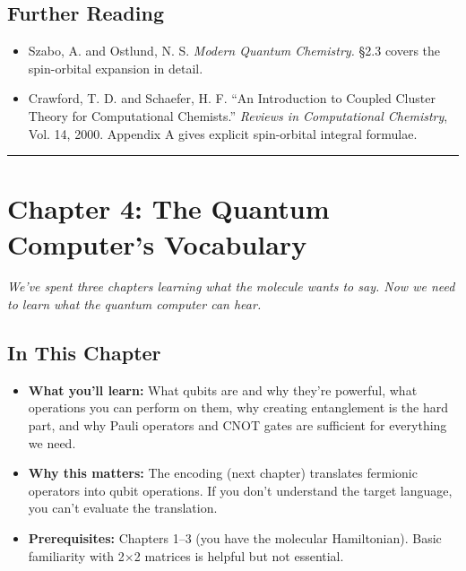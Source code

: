 \documentclass[
  11pt,
  oneside]{book}
\providecommand{\tightlist}{%
  \setlength{\itemsep}{0pt}\setlength{\parskip}{0pt}}
\begin{document}
\section{Further Reading}\label{further-reading-2}

\begin{itemize}
\tightlist
\item
  Szabo, A. and Ostlund, N. S. \emph{Modern Quantum Chemistry.} §2.3
  covers the spin-orbital expansion in detail.
\item
  Crawford, T. D. and Schaefer, H. F. ``An Introduction to Coupled
  Cluster Theory for Computational Chemists.'' \emph{Reviews in
  Computational Chemistry}, Vol. 14, 2000. Appendix A gives explicit
  spin-orbital integral formulae.
\end{itemize}

\begin{center}\rule{0.5\linewidth}{0.5pt}\end{center}

\chapter{Chapter 4: The Quantum Computer's
Vocabulary}\label{chapter-4-the-quantum-computers-vocabulary}

\emph{We've spent three chapters learning what the molecule wants to
say. Now we need to learn what the quantum computer can hear.}

\section{In This Chapter}\label{in-this-chapter-3}

\begin{itemize}
\tightlist
\item
  \textbf{What you'll learn:} What qubits are and why they're powerful,
  what operations you can perform on them, why creating entanglement is
  the hard part, and why Pauli operators and CNOT gates are sufficient
  for everything we need.
\item
  \textbf{Why this matters:} The encoding (next chapter) translates
  fermionic operators into qubit operations. If you don't understand the
  target language, you can't evaluate the translation.
\item
  \textbf{Prerequisites:} Chapters 1--3 (you have the molecular
  Hamiltonian). Basic familiarity with 2$\times$2 matrices is helpful but not
  essential.
\end{itemize}
\end{document}
